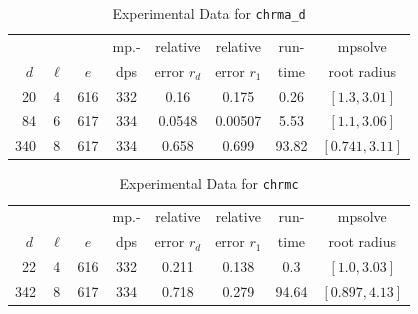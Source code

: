 \documentclass[runningheads]{llncs}
\begin{document}
\begin{table}
\caption{Experimental Data for \texttt{chrma\_d}} %
\label{tab:chrma_d}
\vskip -0.15in
\begin{center}
\begin{small}
\begin{sc}
\begin{tabular}{rccccccc}
\toprule
&  &  & mp.-& relative  & relative & run- & mpsolve \\
$d~$& $\ell$& $e$ & dps&error $r_d$       & error $r_1$ &time& root radius\\
\midrule
20 & 4 & 616 & 332 & 0.16 & 0.175 & 0.26 & $[1.3, 3.01]$\\
 84 & 6 & 617 & 334 & 0.0548 & 0.00507 & 5.53 & $[1.1, 3.06]$\\
 340 & 8 & 617 & 334 & 0.658 & 0.699 & 93.82 & $[0.741, 3.11]$\\
\bottomrule
\end{tabular}
\end{sc}
\end{small}
\end{center}
\vskip 0.05in
\end{table}


\begin{table}
\caption{Experimental Data for \texttt{chrmc}} %
\label{tab:chrmc}
\vskip -0.15in
\begin{center}
\begin{small}
\begin{sc}
\begin{tabular}{rccccccc}
\toprule
&  &  & mp.-& relative  & relative & run- & mpsolve \\
$d~$& $\ell$& $e$ & dps&error $r_d$  & error $r_1$ &time& root radius\\
\midrule
 22 & 4 & 616 & 332 & 0.211 & 0.138 & 0.3 & $[1.0, 3.03]$\\
 342 & 8 & 617 & 334 & 0.718 & 0.279 & 94.64 & $[0.897, 4.13]$\\
\bottomrule
\end{tabular}
\end{sc}
\end{small}
\end{center}
\vskip 0.05in
\end{table}
\end{document}
